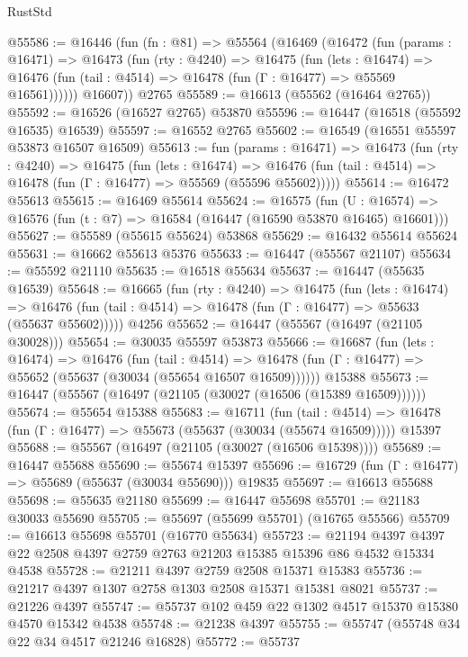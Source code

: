\begin{lexlean}{RustStd}
\begin{coremodule}
@55586 := @16446
    (fun (fn : @81) =>
    @55564
      (@16469
        (@16472
          (fun (params : @16471) =>
          @16473
            (fun (rty : @4240) =>
            @16475
              (fun (lets : @16474) =>
              @16476 (fun (tail : @4514) => @16478 (fun (Γ : @16477) => @55569 @16561))))))
        @16607))
    @2765
@55589 := @16613 (@55562 (@16464 @2765))
@55592 := @16526 (@16527 @2765) @53870
@55596 := @16447 (@16518 (@55592 @16535) @16539)
@55597 := @16552 @2765
@55602 := @16549 (@16551 @55597 @53873 @16507 @16509)
@55613 := fun (params : @16471) =>
  @16473
    (fun (rty : @4240) =>
    @16475
      (fun (lets : @16474) =>
      @16476 (fun (tail : @4514) => @16478 (fun (Γ : @16477) => @55569 (@55596 @55602)))))
@55614 := @16472 @55613
@55615 := @16469 @55614
@55624 := @16575
    (fun (U : @16574) => @16576 (fun (t : @7) => @16584 (@16447 (@16590 @53870 @16465) @16601)))
@55627 := @55589 (@55615 @55624) @53868
@55629 := @16432 @55614 @55624
@55631 := @16662 @55613 @5376
@55633 := @16447 (@55567 @21107)
@55634 := @55592 @21110
@55635 := @16518 @55634
@55637 := @16447 (@55635 @16539)
@55648 := @16665
    (fun (rty : @4240) =>
    @16475
      (fun (lets : @16474) =>
      @16476 (fun (tail : @4514) => @16478 (fun (Γ : @16477) => @55633 (@55637 @55602)))))
    @4256
@55652 := @16447 (@55567 (@16497 (@21105 @30028)))
@55654 := @30035 @55597 @53873
@55666 := @16687
    (fun (lets : @16474) =>
    @16476
      (fun (tail : @4514) =>
      @16478 (fun (Γ : @16477) => @55652 (@55637 (@30034 (@55654 @16507 @16509))))))
    @15388
@55673 := @16447 (@55567 (@16497 (@21105 (@30027 (@16506 (@15389 @16509))))))
@55674 := @55654 @15388
@55683 := @16711
    (fun (tail : @4514) => @16478 (fun (Γ : @16477) => @55673 (@55637 (@30034 (@55674 @16509)))))
    @15397
@55688 := @55567 (@16497 (@21105 (@30027 (@16506 @15398))))
@55689 := @16447 @55688
@55690 := @55674 @15397
@55696 := @16729 (fun (Γ : @16477) => @55689 (@55637 (@30034 @55690))) @19835
@55697 := @16613 @55688
@55698 := @55635 @21180
@55699 := @16447 @55698
@55701 := @21183 @30033 @55690
@55705 := @55697 (@55699 @55701) (@16765 @55566)
@55709 := @16613 @55698 @55701 (@16770 @55634)
@55723 := @21194 @4397 @4397 @22 @2508 @4397 @2759 @2763 @21203 @15385 @15396 @86 @4532 @15334 @4538
@55728 := @21211 @4397 @2759 @2508 @15371 @15383
@55736 := @21217 @4397 @1307 @2758 @1303 @2508 @15371 @15381 @8021
@55737 := @21226 @4397
@55747 := @55737 @102 @459 @22 @1302 @4517 @15370 @15380 @4570 @15342 @4538
@55748 := @21238 @4397
@55755 := @55747 (@55748 @34 @22 @34 @4517 @21246 @16828)
@55772 := @55737

\end{coremodule}
\end{lexlean}
